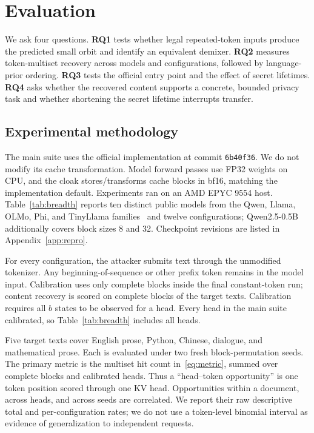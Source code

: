 \section{Evaluation}
\label{sec:evaluation}
We ask four questions. \textbf{RQ1} tests whether legal repeated-token inputs produce the predicted small orbit and identify an equivalent demixer. \textbf{RQ2} measures token-multiset recovery across models and configurations, followed by language-prior ordering. \textbf{RQ3} tests the official entry point and the effect of secret lifetimes. \textbf{RQ4} asks whether the recovered content supports a concrete, bounded privacy task and whether shortening the secret lifetime interrupts transfer.

\subsection{Experimental methodology}
\label{sec:methodology}
The main suite uses the official \scheme{} implementation at commit \texttt{6b40f36}. We do not modify its cache transformation. Model forward passes use FP32 weights on CPU, and the cloak stores/transforms cache blocks in bf16, matching the implementation default. Experiments ran on an AMD EPYC 9554 host. Table~\ref{tab:breadth} reports ten distinct public models from the Qwen, Llama, OLMo, Phi, and TinyLlama families~\cite{qwen25,llama3,olmo,phi3,tinyllama} and twelve configurations; Qwen2.5-0.5B additionally covers block sizes 8 and 32. Checkpoint revisions are listed in Appendix~\ref{app:repro}.

For every configuration, the attacker submits text through the unmodified tokenizer. Any beginning-of-sequence or other prefix token remains in the model input. Calibration uses only complete blocks inside the final constant-token run; content recovery is scored on complete blocks of the target texts. Calibration requires all $b$ states to be observed for a head. Every head in the main suite calibrated, so Table~\ref{tab:breadth} includes all heads.

Five target texts cover English prose, Python, Chinese, dialogue, and mathematical prose. Each is evaluated under two fresh block-permutation seeds. The primary metric is the multiset hit count in~\eqref{eq:metric}, summed over complete blocks and calibrated heads. Thus a ``head--token opportunity'' is one token position scored through one KV head. Opportunities within a document, across heads, and across seeds are correlated. We report their raw descriptive total and per-configuration rates; we do not use a token-level binomial interval as evidence of generalization to independent requests.


